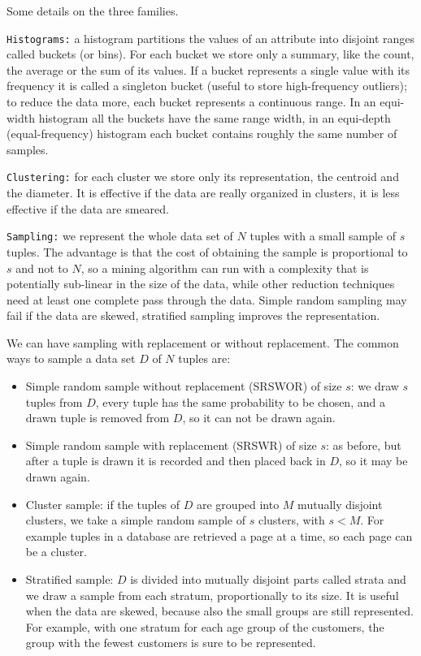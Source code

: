 Some details on the three families.

\texttt{Histograms:} a histogram partitions the values of an attribute into disjoint ranges called buckets (or bins). For each bucket we store only a summary, like the count, the average or the sum of its values. If a bucket represents a single value with its frequency it is called a singleton bucket (useful to store high-frequency outliers); to reduce the data more, each bucket represents a continuous range. In an equi-width histogram all the buckets have the same range width, in an equi-depth (equal-frequency) histogram each bucket contains roughly the same number of samples.

\texttt{Clustering:} for each cluster we store only its representation, the centroid and the diameter. It is effective if the data are really organized in clusters, it is less effective if the data are smeared.

\texttt{Sampling:} we represent the whole data set of $N$ tuples with a small sample of $s$ tuples. The advantage is that the cost of obtaining the sample is proportional to $s$ and not to $N$, so a mining algorithm can run with a complexity that is potentially sub-linear in the size of the data, while other reduction techniques need at least one complete pass through the data. Simple random sampling may fail if the data are skewed, stratified sampling improves the representation.

We can have sampling with replacement or without replacement. The common ways to sample a data set $D$ of $N$ tuples are:
\begin{itemize}
    \item Simple random sample without replacement (SRSWOR) of size $s$: we draw $s$ tuples from $D$, every tuple has the same probability to be chosen, and a drawn tuple is removed from $D$, so it can not be drawn again.
    \item Simple random sample with replacement (SRSWR) of size $s$: as before, but after a tuple is drawn it is recorded and then placed back in $D$, so it may be drawn again.
    \item Cluster sample: if the tuples of $D$ are grouped into $M$ mutually disjoint clusters, we take a simple random sample of $s$ clusters, with $s<M$. For example tuples in a database are retrieved a page at a time, so each page can be a cluster.
    \item Stratified sample: $D$ is divided into mutually disjoint parts called strata and we draw a sample from each stratum, proportionally to its size. It is useful when the data are skewed, because also the small groups are still represented. For example, with one stratum for each age group of the customers, the group with the fewest customers is sure to be represented.
\end{itemize}

